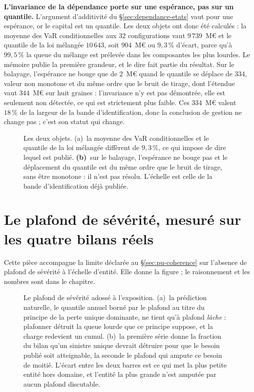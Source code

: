 \textbf{L'invariance de la dépendance porte sur une espérance, pas sur un quantile.} L'argument
d'additivité du \S\ref{sec:dependance-etats} vaut pour une espérance, or le capital est un
quantile. Les deux objets ont donc été calculés : la moyenne des VaR conditionnelles aux $32$
configurations vaut $9\,739$~M\euro{} et le quantile de la loi mélangée $10\,643$, soit
$904$~M\euro{} ou $9{,}3\,\%$ d'écart, parce qu'à $99{,}5\,\%$ la queue du mélange est prélevée
dans les composantes les plus lourdes. Le mémoire publie la première grandeur, et le dire fait
partie du résultat. Sur le balayage, l'espérance ne bouge que de $2$~M\euro{} quand le quantile se
déplace de $334$, valeur non monotone et du même ordre que le bruit de tirage, dont l'étendue vaut
$344$~M\euro{} sur huit graines : l'invariance n'y est pas démontrée, elle est seulement non
détectée, ce qui est strictement plus faible. Ces $334$~M\euro{} valent $18\,\%$ de la largeur de
la bande d'identification, donc la conclusion de gestion ne change pas ; c'est son statut qui
change.

\begin{figure}[htbp]\centering
{}
\caption{Les deux objets. (a)~la moyenne des VaR conditionnelles et le quantile de la
loi mélangée diffèrent de $9{,}3\,\%$, ce qui impose de dire lequel est publié.
\textbf{(b)}~sur le balayage, l'espérance ne bouge pas et le déplacement du quantile est du même
ordre que le bruit de tirage, sans être monotone : il n'est pas résolu. L'échelle est celle de la
bande d'identification déjà publiée.}
\label{fig:var-melange}
\end{figure}

\section{Le plafond de sévérité, mesuré sur les quatre bilans réels}
\label{sec:ann-plafond}


Cette pièce accompagne la limite déclarée au \S\ref{sec:pu-coherence} sur l'absence de plafond de
sévérité à l'échelle d'entité. Elle donne la figure ; le raisonnement et les nombres sont dans le
chapitre.

\begin{figure}[htbp]\centering
{}
\caption{Le plafond de sévérité adossé à l'exposition. (a)~la prédiction naturelle, le
quantile annuel borné par le plafond au titre du principe de la perte unique dominante, ne tient
qu'à plafond \emph{lâche} : plafonner détruit la queue lourde que ce principe suppose, et la
charge redevient un cumul. (b)~la première série donne la fraction du bilan qu'un sinistre
unique devrait détruire pour que le besoin publié soit atteignable, la seconde le plafond qui
ampute ce besoin de moitié. L'écart entre les deux barres est ce qui met la plus petite entité hors
domaine, et l'entité la plus grande n'est amputée par aucun plafond discutable.}
\label{fig:plafond-exposition}
\end{figure}

